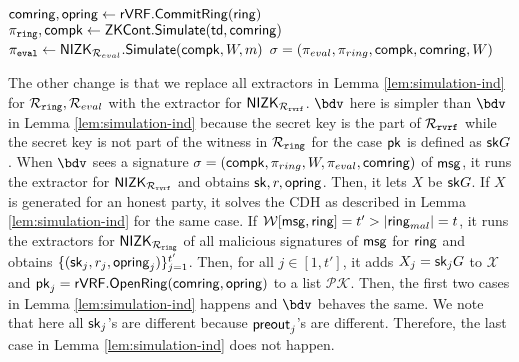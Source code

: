 \begin{algorithm}
\caption{$\gen_{sign}(\ring,W,\pk,\aux,m)$}
\label{alg:gensignSGbdv}	 	
\begin{algorithmic}[1]
	\State $ \mathsf{comring}, \mathsf{opring} \leftarrow {\ensuremath{\mathsf{rVRF}}}.{\mathsf{CommitRing}}(\mathsf{ring}) $
	\State $ \pi_{\mathtt{ring}},\mathsf{compk} \leftarrow {\ensuremath{\mathsf{ZKCont}}}.{\mathsf{Simulate}}(\mathsf{td},\mathsf{comring}) $ 
	\State $ \pi_{\mathtt{eval}} \leftarrow {\ensuremath{\mathsf{NIZK}}}_{\mathcal{R}_{eval}}.{\mathsf{Simulate}}(\mathsf{compk}, W,m) $
	\State\Return$ \sigma = (\pi_{eval},\pi_{ring},\mathsf{compk},\mathsf{comring},W) $
\end{algorithmic}

\end{algorithm}

The other change is that we replace all extractors in Lemma \ref{lem:simulation-ind} for $ \mathcal{R}_{\mathtt{ring}}, \mathcal{R}_{eval} $ with the extractor  for $ {\mathsf{NIZK}}_{\mathcal{R}_{\mathtt{rvrf}}} $. $ \bdv $ here is simpler than $ \bdv$ in Lemma \ref{lem:simulation-ind} because the secret key is the part of  $\mathcal{R}_{\mathtt{rvrf}}$ while the secret key is not part of the witness in $ \mathcal{R}_{\mathtt{ring}} $ for the case $ \mathsf{pk} $ is defined as $ \mathsf{sk}G $.
When $ \bdv $ sees a signature $ \sigma = (\mathsf{compk}, \pi_{ring}, W, \pi_{eval}, \mathsf{comring}) $ of $ \mathsf{msg} $, it runs the extractor for $ {\mathsf{NIZK}}_{\mathcal{R}_{\mathtt{rvrf}}} $ and obtains $ \mathsf{sk},r, \mathsf{opring} $. Then, it lets $ X $ be $ \mathsf{sk}G $. If $ X $ is generated for an honest party, it solves the CDH as described in Lemma \ref{lem:simulation-ind} for the same case. If $ \mathcal{W}[\mathsf{msg},\mathsf{ring}] = t' > |\mathsf{ring}_{mal}| = t$, it runs the extractors for $ {\mathsf{NIZK}}_{\mathcal{R}_{\mathtt{ring}}} $ of all malicious signatures of $ \mathsf{msg} $ for $ \mathsf{ring} $ and obtains $ \{(\mathsf{sk}_j,r_j,\mathsf{opring}_j)\}_{j = 1}^{t'}$. Then, for all $ j \in [1,t']$, it adds $ X_j = \mathsf{sk}_j G $ to $ \mathcal{X} $ and $ \mathsf{pk}_j  = {\mathsf{rVRF}}.{\mathsf{OpenRing}}(\mathsf{comring},\mathsf{opring})$ to a list $ \mathcal{PK} $. Then, the first two cases in Lemma \ref{lem:simulation-ind} happens and $ \bdv $ behaves the same.
We note that here all $ \mathsf{sk}_j $'s are different because $ {\mathsf{preout}}_j $'s are different. Therefore, the last case in Lemma  \ref{lem:simulation-ind} does not happen.



